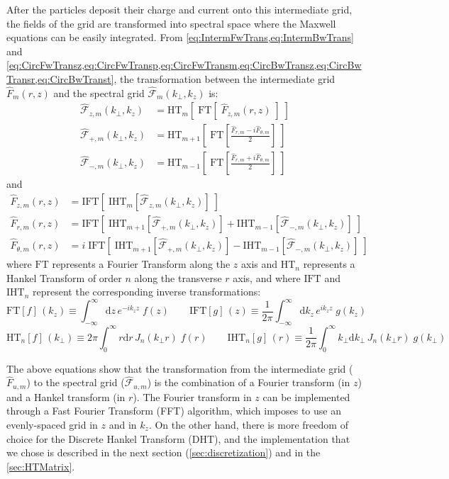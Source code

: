 \documentclass[1p,times,authoryear]{elsarticle}
\newcommand{\Integ}[1]{\int_{-\infty}^{\infty} \!\!\!\!\!\!
  \mathrm{d}#1}
\newcommand{\RInteg}[1]{\int_{0}^{\infty} \!\!\!\!\! #1\mathrm{d}#1}
\newcommand{\spectral}[1]{\hat{\mathcal{#1}}}
\begin{document}
After the particles deposit their charge and current onto this
intermediate grid, the fields of the grid are transformed into spectral
space where the Maxwell equations can be easily integrated. From
\cref{eq:IntermFwTrans,eq:IntermBwTrans} and
\cref{eq:CircFwTransz,eq:CircFwTransp,eq:CircFwTransm,eq:CircBwTransz,eq:CircBwTransr,eq:CircBwTranst}, 
the transformation between the intermediate grid $\hat{F}_{m}(r,z)$
and the spectral grid $\spectral{F}_m(k_\perp, k_z)$ is:
\begin{align}
\spectral{F}_{z,m}(k_\perp,k_z) & = \mathrm{HT}_{m} [ \; \mathrm{FT}
                               [ \; \hat{F}_{z,m}(r,z) \; ] \;] \\
\spectral{F}_{+,m}(k_\perp,k_z) &= \mathrm{HT}_{m+1}\left[ \; \mathrm{FT} \left[ \frac{
  \hat{F}_{r,m} -i  \hat{F}_{\theta,m} }{2}  \right] \;\right] \\
\spectral{F}_{-,m}(k_\perp,k_z) &= \mathrm{HT}_{m-1} \left[ \;\mathrm{FT} \left[ \frac{
  \hat{F}_{r,m} +i  \hat{F}_{\theta,m} }{2}  \right] \;\right] 
\end{align}
and
\begin{align}
\hat{F}_{z,m}(r,z) &= \mathrm{IFT} [\; \mathrm{IHT}_{m} [
                         \spectral{F}_{z,m}(k_\perp,k_z) ] \; ] \\
\hat{F}_{r,m}(r,z) & = \mathrm{IFT} \left[ \; \mathrm{IHT}_{m+1}
                         [ \spectral{F}_{+,m}(k_\perp,k_z) ] + \mathrm{IHT}_{m-1} [
                         \spectral{F}_{-,m}(k_\perp,k_z) ] \; \right] \label{eq:FTHTr}\\
\hat{F}_{\theta,m}(r,z) & = i\;\mathrm{IFT} \left[ \; \mathrm{IHT}_{m+1}
                         [ \spectral{F}_{+,m}(k_\perp,k_z) ] -
                          \mathrm{IHT}_{m-1} [
                          \spectral{F}_{-,m}(k_\perp,k_z) ] \; \right]
\label{eq:FTHTt}
\end{align}
where $\mathrm{FT}$ represents a Fourier Transform along the $z$
axis and $\mathrm{HT}_{n}$ represents a Hankel Transform of order
$n$ along the transverse $r$ axis, and where $\mathrm{IFT}$ and
$\mathrm{IHT}_{n}$ represent the corresponding inverse
transformations:
\[ \mathrm{FT} [f]\, (k_z) \equiv \Integ{z} \, e^{-ik_zz} \; f(z) \qquad 
\mathrm{IFT} [g] \,(z)\equiv \frac{1}{2\pi}\Integ{k_z} \, e^{ik_zz} \;  g(k_z)\]
\[ \mathrm{HT}_{n} [f]\,(k_\perp) \equiv 2\pi \RInteg{r} \,
J_{n}(k_\perp r) \; f(r) \qquad 
\mathrm{IHT}_{n} [g]\,(r) \equiv \frac{1}{2\pi}\RInteg{k_\perp} \,  J_{n}(k_\perp r)  \;  g(k_\perp) \]

The above equations show that the transformation from the intermediate
grid ($\hat{F}_{u,m}$) to the spectral grid ($\spectral{F}_{u,m}$) is
the combination of a Fourier transform (in $z$) and a Hankel transform
(in $r$). The Fourier transform in $z$ can be implemented through a Fast Fourier
Transform (FFT) algorithm, which imposes to use an evenly-spaced grid
in $z$ and in $k_z$. On the other hand, there is more freedom of
choice for the Discrete Hankel Transform (DHT), and the implementation that
we chose is described in the next section
(\cref{sec:discretization}) and in the \ref{sec:HTMatrix}.
\end{document}
